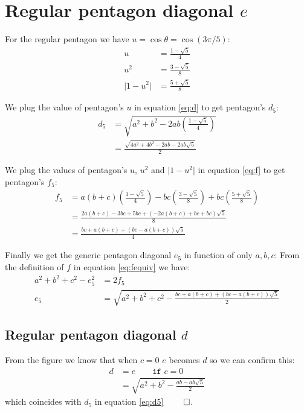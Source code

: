 \documentclass[11pt]{article}
\begin{document}
\section{Regular pentagon diagonal $e$}

For the regular pentagon we have $u = \cos\theta = \cos(3\pi/5)$:
\begin{align}
u &= \frac{1-\sqrt{5}}{4}\\
u^2 &= \frac{3-\sqrt{5}}{8}\\
\lvert 1-u^2 \rvert &= \frac{5+\sqrt5}{8}
\end{align}

We plug the value of pentagon's $u$ in equation \ref{eq:d}
to get pentagon's $d_5$:
\begin{align}
d_5 &= \sqrt{a^2 + b^2 - 2ab\left(\frac{1-\sqrt{5}}{4}\right)} \nonumber\\
 &= \frac{\sqrt{4a^2 + 4b^2 - 2ab - 2ab\sqrt5}}{2} \label{eq:d5}
\end{align}

We plug the values of pentagon's $u$, $u^2$ and $\lvert 1-u^2 \rvert$ in equation \ref{eq:f}
to get pentagon's $f_5$:
\begin{align}
f_5 &= a\left(b+c\right)\left(\frac{1-\sqrt5}4\right)
 - bc\left(\frac{3-\sqrt5}8\right)
 + bc\left(\frac{5+\sqrt5}8\right)\nonumber\\
 &= \frac{2a(b+c) - 3bc + 5bc + (-2a(b+c) +bc + bc)\sqrt5}8\nonumber\\
 &= \frac{bc + a(b+c) + (bc - a(b+c))\sqrt5}4 \label{eq:f5}
\end{align}

Finally we get the generic pentagon diagonal $e_5$ in function of only $a,b,c$:
From the definition of $f$ in equation \ref{eq:fequiv} we have:
\begin{align}
a^2 + b^2 + c^2 - e^2_5 &= 2f_5 \nonumber\\
e_5 &= \sqrt{a^2 + b^2 + c^2 - \frac{bc + a(b+c) + (bc - a(b+c))\sqrt5}2} \label{eq:e5}
\end{align}

\subsection {Regular pentagon diagonal $d$}

From the figure we know that when $c=0$ $e$ becomes $d$ so we can confirm this:
\begin{align}
d &= e \qquad \texttt{if } c=0 \nonumber\\
 &= \sqrt{a^2 + b^2 - \frac{ ab - ab\sqrt5}2}
\end{align}
which coincides with $d_5$ in equation \ref{eq:d5} $\qed$.
\end{document}
